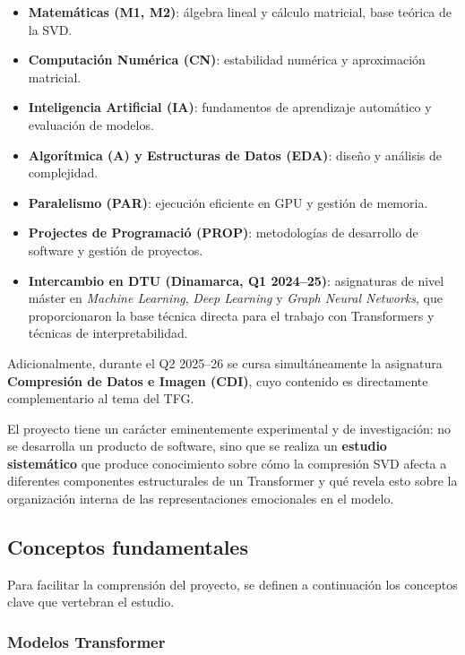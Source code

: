 \documentclass[11pt, a4paper]{article}
\begin{document}
\begin{itemize}[nosep]
    \item \textbf{Matemáticas (M1, M2)}: álgebra lineal y cálculo matricial, base teórica de la SVD.
    \item \textbf{Computación Numérica (CN)}: estabilidad numérica y aproximación matricial.
    \item \textbf{Inteligencia Artificial (IA)}: fundamentos de aprendizaje automático y evaluación de modelos.
    \item \textbf{Algorítmica (A) y Estructuras de Datos (EDA)}: diseño y análisis de complejidad.
    \item \textbf{Paralelismo (PAR)}: ejecución eficiente en GPU y gestión de memoria.
    \item \textbf{Projectes de Programació (PROP)}: metodologías de desarrollo de software y gestión de proyectos.
    \item \textbf{Intercambio en DTU (Dinamarca, Q1 2024--25)}: asignaturas de nivel máster en \textit{Machine Learning}, \textit{Deep Learning} y \textit{Graph Neural Networks}, que proporcionaron la base técnica directa para el trabajo con Transformers y técnicas de interpretabilidad.
\end{itemize}

Adicionalmente, durante el Q2 2025--26 se cursa simultáneamente la asignatura \textbf{Compresión de Datos e Imagen (CDI)}, cuyo contenido es directamente complementario al tema del TFG.

El proyecto tiene un carácter eminentemente experimental y de investigación: no se desarrolla un producto de software, sino que se realiza un \textbf{estudio sistemático} que produce conocimiento sobre cómo la compresión SVD afecta a diferentes componentes estructurales de un Transformer y qué revela esto sobre la organización interna de las representaciones emocionales en el modelo.

\subsection{Conceptos fundamentales}
\label{sec:conceptos}

Para facilitar la comprensión del proyecto, se definen a continuación los conceptos clave que vertebran el estudio.

\subsubsection{Modelos Transformer}
\end{document}
